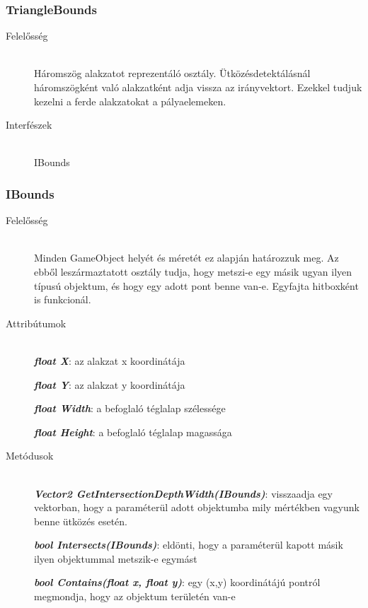 \subsubsection{TriangleBounds}
	\begin{description}
		\item[Felelősség] \hfill \\
		Háromszög alakzatot reprezentáló osztály. Ütközésdetektálásnál háromszögként való alakzatként adja vissza az irányvektort. Ezekkel tudjuk kezelni a ferde alakzatokat a pályaelemeken.
				
		\item[Interfészek] \hfill \\
		IBounds
		
	\end{description}

	
\subsubsection{IBounds}
	\begin{description}
		\item[Felelősség] \hfill \\
		 Minden GameObject helyét és méretét ez alapján határozzuk meg. Az ebből leszármaztatott osztály tudja, hogy metszi-e egy másik ugyan ilyen típusú objektum, és hogy egy adott pont benne van-e. Egyfajta hitboxként is funkcionál. 
		 
		\item[Attribútumok]\hfill \\
		\textbf{\emph{float X}}: az alakzat x koordinátája
		
		\textbf{\emph{float Y}}: az alakzat y koordinátája
		
		\textbf{\emph{float Width}}: a befoglaló téglalap szélessége
		
		\textbf{\emph{float Height}}: a befoglaló téglalap magassága
		
		\item[Metódusok]\hfill \\		
		\textbf{\emph{Vector2 GetIntersectionDepthWidth(IBounds)}}: visszaadja egy vektorban, hogy a paraméterül adott objektumba mily mértékben vagyunk benne ütközés esetén.
		
		\textbf{\emph{bool Intersects(IBounds)}}: eldönti, hogy a paraméterül kapott másik ilyen objektummal metszik-e egymást
		
		\textbf{\emph{bool Contains(float x, float y)}}: egy (x,y) koordinátájú pontról megmondja, hogy az objektum területén van-e
								
	\end{description}

